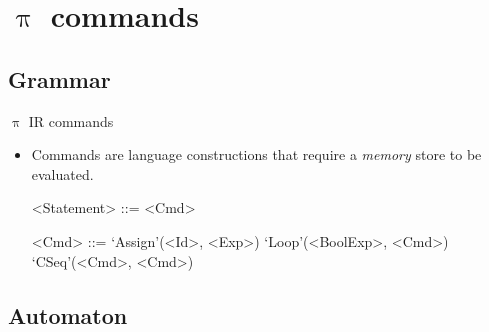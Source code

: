\documentclass{beamer}
\begin{document}
\section{$\uppi$ commands}

\subsection{Grammar}


\begin{frame}{{\color{red} $\uppi$ IR} commands}

\begin{itemize}
\item Commands are language constructions that require a \emph{memory} store to be evaluated. 
\begin{grammar}
<Statement> ::=  <Cmd> 

<Cmd>       ::=  `Assign'(<Id>, <Exp>) \alt `Loop'(<BoolExp>, <Cmd>) \alt  `CSeq'(<Cmd>, <Cmd>)
\end{grammar}


\end{itemize}

\end{frame}

\subsection{Automaton}

\end{document}
